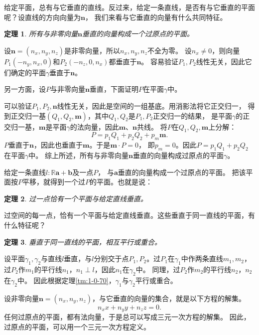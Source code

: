 \documentclass[12pt,UTF8]{ctexbook}
\newtheorem{tm}{定理}[section]
\begin{document}
给定平面，总有与它垂直的直线。反过来，给定一条直线，是否有与它垂直的平面呢？设直线的方向向量为$\mathbf{n}$，
我们来看与它垂直的向量有什么共同特征。
\begin{tm}\label{tm:1-3-60}
    所有与非零向量$\mathbf{n}$垂直的向量构成一个过原点的平面。    
\end{tm}
\begin{proof2}
设$\mathbf{n} = (n_x, n_y, n_z)$是非零向量，所以$n_x, n_y, n_z$不全为零。
设$n_x\neq 0$，则向量$P_1(-n_y, n_x, 0)$和$P_2(-n_z, 0, n_x)$都垂直于$\mathbf{n}$。
容易验证$P_1,P_2$线性无关，因此它们确定的平面$\gamma$垂直于$\mathbf{n}$。

另一方面，设$P$与非零向量$\mathbf{n}$垂直，下面证明$P$在平面$\gamma$中。

可以验证$P_1, P_2, \mathbf{n}$线性无关，因此是空间的一组基底。用消影法将它正交归一，
得到正交归一基$(Q_1, Q_2,\mathbf{m})$，其中$Q_1,Q_2$是$P_1, P_2$正交归一的结果，
是平面$\gamma$的正交归一基，$\mathbf{m}$是平面$\gamma$的法向量，因此$\mathbf{m}$、$\mathbf{n}$共线。
将$P$在$Q_1, Q_2,\mathbf{m}$上分解：
$$ P = p_1Q_1 + p_2Q_2 + p_m\mathbf{m}.$$
$P$垂直于$\mathbf{n}$，因此也垂直于$\mathbf{m}$。于是$\mathbf{m}\cdot P = 0$，
即$p_m = 0$。因此$P = p_1Q_1 + p_2Q_2$在平面$\gamma$中。
综上所述，所有与非零向量$\mathbf{n}$垂直的向量构成过原点的平面$\gamma$。

\end{proof2}

给定一条直线$l:\mathbb{R}\mathbf{a} + \mathbf{b}$及一点$P$，
与$\mathbf{a}$垂直的向量构成一个过原点的平面。
把该平面按$P$平移，就得到一个过$P$的平面。也就是说：
\begin{tm}\label{tm:1-3-70}
    过一点恰有一个平面与给定直线垂直。
\end{tm}

过空间的每一点，恰有一个平面与给定直线垂直。这些垂直于同一直线的平面，有什么特征呢？
\begin{tm}\label{tm:1-3-80}
    垂直于同一直线的平面，相互平行或重合。
\end{tm}
\begin{proof2}
    设平面$\gamma_1,\gamma_2$与直线$l$垂直，与$l$分别交于点$P_1,P_2$。过$P_1$在$\gamma_1$中作两条直线$m_1,m_2$，
    过$P_2$作$m_1$的平行线$n_1$，$n_1\perp l$，因此$n_1$在$\gamma_2$中。
    同理，过$P_2$作$m_2$的平行线$n_2$，$n_2$在$\gamma_2$中。
    因此根据定理\ref{tm:1-0-70}，$\gamma_1$与$\gamma_2$平行或重合。
\end{proof2}

设非零向量$\mathbf{n} = (n_x, n_y, n_z)$，与它垂直的向量的集合，就是以下方程的解集。
$$ n_xx + n_yy + n_zz = 0. $$
任何过原点的平面，都有法向量，于是总可以写成三元一次方程的解集。
因此，过原点的平面，可以用一个三元一次方程定义。
\end{document}
